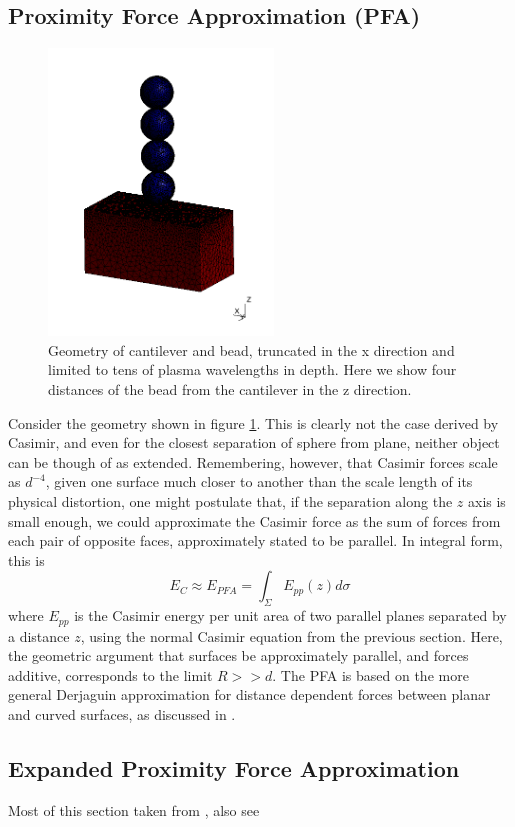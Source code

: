 \documentclass[11pt,traditabstract]{article}
\begin{document}
\subsection{Proximity Force Approximation (PFA)}

\begin{figure}[!h]
\centering
\includegraphics[height=3in]{geometry}
\caption{Geometry of cantilever and bead, truncated in the x direction and limited to tens of plasma wavelengths in depth. Here we show four distances of the bead from the cantilever in the z direction.}\label{fig:geo}
\end{figure}

Consider the geometry shown in figure \ref{fig:geo}. This is clearly not the case derived by Casimir, and even for the closest separation of sphere from plane, neither object can be though of as extended. Remembering, however, that Casimir forces scale as $d^{-4}$, given one surface much closer to another than the scale length of its physical distortion, one might postulate that, if the separation along the $z$ axis is small enough, we could approximate the Casimir force as the sum of forces from each pair of opposite faces, approximately stated to be parallel. In integral form, this is \citep{Dexp}
$$
E_{C}\approx E_{PFA}=\int_{\Sigma}E_{pp}(z)d\sigma
$$
where $E_{pp}$ is the Casimir energy per unit area of two parallel planes separated by a distance $z$, using the normal Casimir equation from the previous section. Here, the geometric argument that surfaces be approximately parallel, and forces additive, corresponds to the limit $R>>d$. The PFA is based on the more general Derjaguin approximation for distance dependent forces between planar and curved surfaces, as discussed in \citet{BeyondPFA}.

\subsection{Expanded Proximity Force Approximation}
Most of this section taken from \citet{Dexp}, also see \citet{Bimonte12}
\end{document}
